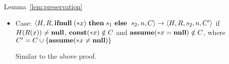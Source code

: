 \begin{pfof}{Lemma~\ref{lem:preservation}}
\begin{itemize}






  
  \item Case: \(\langle H, R, \IFNULL \Sirx \ \THEN s_{1} \ \ELSE
  \ s_{2}, n, C\rangle \rightarrow \langle H, R, s_{2}, n, C'
  \rangle\) if \(H(R(x)) \neq \mathbf{null}\), \(\mathbf{const}(*x) \notin C\) and
  \(\mathbf{assume}(*x = \mathbf{null}) \notin C\), where \(C' = C \cup \{\mathbf{assume}(*x \ne \mathbf{null})\}\)

  Similar to the above proof.
  
\end{itemize}
\end{pfof}  

